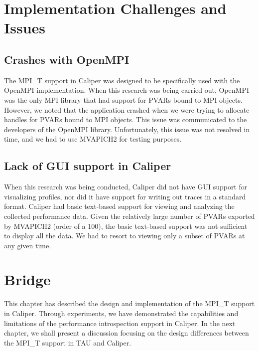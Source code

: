 \section{Implementation Challenges and Issues}
\subsection{Crashes with OpenMPI}
The MPI\_T support in Caliper was designed to be specifically used with the OpenMPI implementation. When this research was being carried out, OpenMPI was the only MPI library that had support for PVARs bound to MPI objects. However, we noted that the application crashed when we were trying to allocate handles for PVARs bound to MPI objects. This issue was communicated to the developers of the OpenMPI library. Unfortunately, this issue was not resolved in time, and we had to use MVAPICH2 for testing purposes.

\subsection{Lack of GUI support in Caliper}
When this research was being conducted, Caliper did not have GUI support for visualizing profiles, nor did it have support for writing out traces in a standard format. Caliper had basic text-based support for viewing and analyzing the collected performance data. Given the relatively large number of PVARs exported by MVAPICH2 (order of a 100), the basic text-based support was not sufficient to display all the data. We had to resort to viewing only a subset of PVARs at any given time.

\section{Bridge}
This chapter has described the design and implementation of the MPI\_T support in Caliper. Through experiments, we have demonstrated the capabilities and limitations of the performance introspection support in Caliper. In the next chapter, we shall present a discussion focusing on the design differences between the MPI\_T support in TAU and Caliper. 
